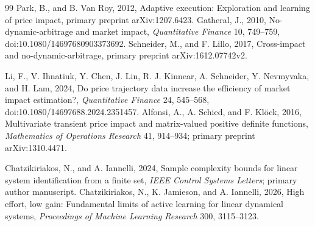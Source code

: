 \documentclass[12pt]{article}
\theoremstyle{definition}
\theoremstyle{remark}
\begin{document}
\begin{thebibliography}{99}
Park, B., and B. Van Roy, 2012, Adaptive execution: Exploration and learning of price impact, primary preprint arXiv:1207.6423.
Gatheral, J., 2010, No-dynamic-arbitrage and market impact, \emph{Quantitative Finance} 10, 749--759, doi:10.1080/14697680903373692.
Schneider, M., and F. Lillo, 2017, Cross-impact and no-dynamic-arbitrage, primary preprint arXiv:1612.07742v2.

Li, F., V. Ihnatiuk, Y. Chen, J. Lin, R. J. Kinnear, A. Schneider, Y. Nevmyvaka, and H. Lam, 2024, Do price trajectory data increase the efficiency of market impact estimation?, \emph{Quantitative Finance} 24, 545--568, doi:10.1080/14697688.2024.2351457.
Alfonsi, A., A. Schied, and F. Kl\"ock, 2016, Multivariate transient price impact and matrix-valued positive definite functions, \emph{Mathematics of Operations Research} 41, 914--934; primary preprint arXiv:1310.4471.

Chatzikiriakos, N., and A. Iannelli, 2024, Sample complexity bounds for linear system identification from a finite set, \emph{IEEE Control Systems Letters}; primary author manuscript.
Chatzikiriakos, N., K. Jamieson, and A. Iannelli, 2026, High effort, low gain: Fundamental limits of active learning for linear dynamical systems, \emph{Proceedings of Machine Learning Research} 300, 3115--3123.

\end{thebibliography}
\end{document}
